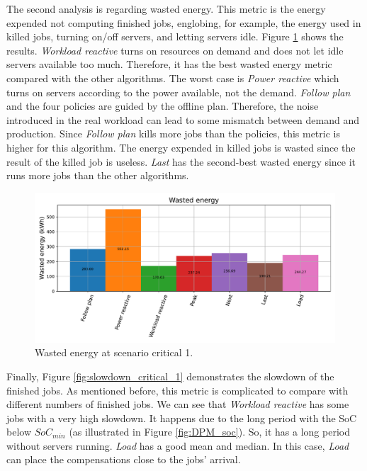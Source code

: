The second analysis is regarding wasted energy. This metric is the energy expended not computing finished jobs, englobing, for example, the energy used in killed jobs, turning on/off servers, and letting servers idle. Figure \ref{fig:energy_critical_1} shows the results. \emph{Workload reactive} turns on resources on demand and does not let idle servers available too much. Therefore, it has the best wasted energy metric compared with the other algorithms. The worst case is \emph{Power reactive} which turns on servers according to the power available, not the demand. \emph{Follow plan} and the four policies are guided by the offline plan. Therefore, the noise introduced in the real workload can lead to some mismatch between demand and production. Since \emph{Follow plan} kills more jobs than the policies, this metric is higher for this algorithm. The energy expended in killed jobs is wasted since the result of the killed job is useless. \emph{Last} has the second-best wasted energy since it runs more jobs than the other algorithms.

\begin{figure}[!htb]
    \centering
    \includegraphics[scale=0.55]{Images/Compensations/energy_critical_1.pdf}
    \caption{Wasted energy at scenario critical 1.}
    \label{fig:energy_critical_1}
\end{figure}

Finally, Figure \ref{fig:slowdown_critical_1} demonstrates the slowdown of the finished jobs. As mentioned before, this metric is complicated to compare with different numbers of finished jobs. We can see that \emph{Workload reactive} has some jobs with a very high slowdown. It happens due to the long period with the SoC below $SoC_{min}$ (as illustrated in Figure \ref{fig:DPM_soc}). So, it has a long period without servers running. \emph{Load} has a good mean and median. In this case, \emph{Load} can place the compensations close to the jobs' arrival. 

